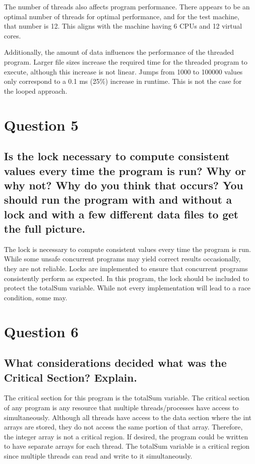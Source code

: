 \documentclass{assignment-x}
\begin{document}
The number of threads also affects program performance. There appears to be an optimal number of threads for optimal performance, and for the test machine, that number is 12. This aligns with the machine having 6 CPUs and 12 virtual cores.

Additionally, the amount of data influences the performance of the threaded program. Larger file sizes increase the required time for the threaded program to execute, although this increase is not linear. Jumps from 1000 to 100000 values only correspond to a 0.1 ms (25\%) increase in runtime. This is not the case for the looped approach.

\section{Question 5}
\subsection{Is the lock necessary to compute consistent values every time the program is run? Why or why not? Why do you think that occurs? You should run the program with and without a lock and with a few different data files to get the full picture.}
The lock is necessary to compute consistent values every time the program is run. While some unsafe concurrent programs may yield correct results occasionally, they are not reliable. Locks are implemented to ensure that concurrent programs consistently perform as expected. In this program, the lock should be included to protect the totalSum variable. While not every implementation will lead to a race condition, some may.

\section{Question 6}
\subsection{What considerations decided what was the Critical Section? Explain.}
The critical section for this program is the totalSum variable. The critical section of any program is any resource that multiple threads/processes have access to simultaneously. Although all threads have access to the data section where the int arrays are stored, they do not access the same portion of that array. Therefore, the integer array is not a critical region. If desired, the program could be written to have separate arrays for each thread. The totalSum variable is a critical region since multiple threads can read and write to it simultaneously.
\end{document}
